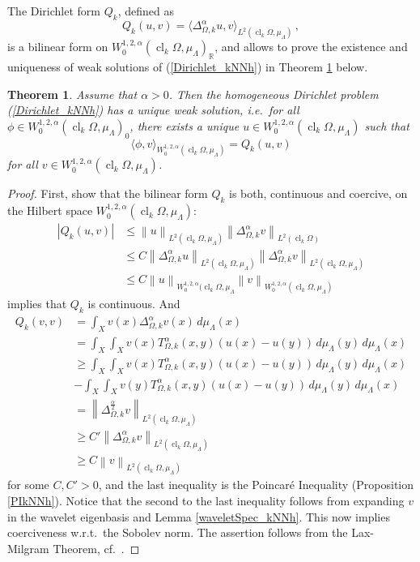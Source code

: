 \documentclass[a4paper,draft]{ZbRad}
\theoremstyle{plain}
\newtheorem{thm}{Theorem}[section]
\theoremstyle{definition}
\numberwithin{equation}{section}
\renewcommand{\le}{\leqslant}\renewcommand{\leq}{\leqslant}
\renewcommand{\ge}{\geqslant}\renewcommand{\geq}{\geqslant}
\newcommand{\absolute}[1]{\left\lvert#1\right\rvert}
\newcommand{\norm}[1]{\left\|#1\right\|}
\DeclareMathOperator{\closure}{cl}
\begin{document}
The Dirichlet form $Q_k$, defined as
\[
Q_k(u,v) = \langle\Delta^\alpha_{\Omega,k}u, v\rangle_{L^2(\closure_k\Omega,\mu_\Lambda)}\,,
\]
is a bilinear form on $W_0^{1,2,\alpha}(\closure_k\Omega,\mu_\Lambda)_{\mathbb{R}}$, and allows to prove the existence
and uniqueness of weak solutions of (\ref{Dirichlet_kNNh}) in Theorem 
\ref{DirichletSolution_kNNh} below.

\begin{thm}\label{DirichletSolution_kNNh}
Assume that $\alpha > 0$. Then the homogeneous Dirichlet problem
(\ref{Dirichlet_kNNh}) has a unique weak solution, i.e.\ for all 
$\phi\in W_0^{1,2,\alpha}(\closure_k\Omega,\mu_\Lambda)_0$, there exists
a unique $u\in W_0^{1,2,\alpha}(\closure_k \Omega,\mu_\Lambda)$ such that
\[
\langle\phi, v\rangle_{W_0^{1,2,\alpha}(\closure_k \Omega,\mu_\Lambda)} = 
Q_k(u,v)
\]
for all $v \in W_0^{1,2,\alpha}(\closure_k\Omega,\mu_\Lambda)$.
\end{thm}

\begin{proof}
First, show that the bilinear form $Q_k$ is both, continuous and coercive,
on the Hilbert space $W_0^{1,2,\alpha}(\closure_k\Omega,\mu_\Lambda)$:
\begin{align*}
\absolute{Q_k(u,v)}&\le\norm{u}_{L^2(\closure_k\Omega,\mu_\Lambda)}
\norm{\Delta^\alpha_{\Omega,k}v}_{L^2(\closure_k\Omega)}
\\
&\le C\norm{\Delta^\alpha_{\Omega,k}u}_{L^2(\closure_k\Omega,\mu_\Lambda)}
\norm{\Delta^\alpha_{\Omega,k}v}_{L^2(\closure_k\Omega,\mu_\Lambda)}
\\
&\le C\norm{u}_{W_0^{1,2,\alpha}(\closure_k\Omega,\mu_\Lambda}\norm{v}_{W_0^{1,2,\alpha}(\closure_k\Omega,\mu_\Lambda)}
\end{align*}
implies that $Q_k$ is continuous. And
\begin{align*}
Q_k(v,v)&=\int_{X}v(x)\Delta^\alpha_{\Omega,k}v(x)\,d\mu_\Lambda(x)
\\
&=\int_X\int_X v(x)T_{\Omega,k}^\alpha(x,y)(u(x)-u(y))\,d\mu_\Lambda(y)\,d\mu_\Lambda(x)
\\
&\ge
\int_X\int_X v(x)T_{\Omega,k}^\alpha(x,y)(u(x)-u(y))\,d\mu_\Lambda(y)\,d\mu_\Lambda(x)
\\
&-\int_X\int_X v(y)T_{\Omega,k}^\alpha(x,y)(u(x)-u(y))\,d\mu_\Lambda(y)\,d\mu_\Lambda(x)
\\
&=\norm{\Delta_{\Omega,k}^{\frac{\alpha}{2}}v}_{L^2(\closure_k\Omega,\mu_\Lambda)}
\\
&\ge C'
\norm{\Delta_{\Omega,k}^\alpha v}_{L^2(\closure_k\Omega,\mu_\Lambda)}
\\
&\ge C\norm{v}_{L^2(\closure_k\Omega,\mu_\Lambda)}
\end{align*}
for some $C,C'>0$, and the last inequality is the Poincar\'e Inequality (Proposition \ref{PIkNNh}). Notice that the second to the last inequality follows from expanding $v$ in the wavelet eigenbasis and Lemma \ref{waveletSpec_kNNh}.
This now implies coerciveness w.r.t.\ the Sobolev norm. The assertion 
follows from the Lax-Milgram Theorem, cf.\ \cite[Corollary 5.8]{Brezis2010}.
\end{proof}
\end{document}
